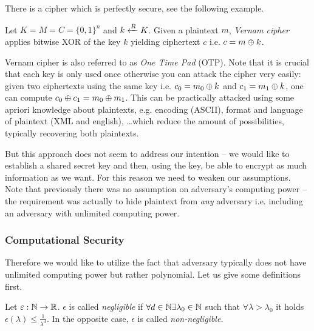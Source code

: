 There is a cipher which is perfectly secure, see the following example.

\begin{example}
	Let $K = M = C = \{0,1\}^n$ and $k\xleftarrow{R} K$. Given a plaintext $m$, {\em Vernam cipher} applies bitwise XOR of the key $k$ yielding ciphertext $c$ i.e. $c = m\oplus k$.
\end{example}

\begin{note}
	Vernam cipher is also referred to as {\em One Time Pad} (OTP). Note that it is crucial that each key is only used once otherwise you can attack the cipher very easily: given two ciphertexts using the same key i.e. $c_0=m_0\oplus k$ and $c_1=m_1\oplus k$, one can compute $c_0\oplus c_1 = m_0\oplus m_1$. This can be practically attacked using some apriori knowledge about plaintexts, e.g. encoding (ASCII), format and language of plaintext (XML and english), \ldots which reduce the amount of possibilities, typically recovering both plaintexts.
\end{note}

But this approach does not seem to address our intention -- we would like to establish a shared secret key and then, using the key, be able to encrypt as much information as we want. For this reason we need to weaken our assumptions. Note that previously there was no assumption on adversary's computing power -- the requirement was actually to hide plaintext from {\em any} adversary i.e. including an adversary with unlimited computing power.

\subsubsection{Computational Security}

Therefore we would like to utilize the fact that adversary typically does not have unlimited computing power but rather polynomial. Let us give some definitions first.   %

\begin{defn}
\label{def:neglfunc}
	Let $\varepsilon:\mathbb{N}\rightarrow\mathbb{R}$. $\epsilon$ is called {\em negligible} if $\forall d\in\mathbb{N}\exists \lambda_0\in\mathbb{N}$ such that $\forall \lambda>\lambda_0$ it holds $\epsilon(\lambda)\leq\frac{1}{\lambda^d}$. In the opposite case, $\epsilon$ is called {\em non-negligible}.
\end{defn}

